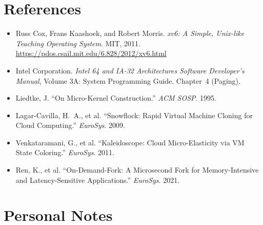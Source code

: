 \documentclass[11pt]{article}
\begin{document}
\section{References}

\begin{itemize}
    \item Russ Cox, Frans Kaashoek, and Robert Morris. \textit{xv6: A Simple, Unix-like Teaching Operating System}. MIT, 2011. \url{https://pdos.csail.mit.edu/6.828/2012/xv6.html}
    \item Intel Corporation. \textit{Intel 64 and IA-32 Architectures Software Developer's Manual}, Volume 3A: System Programming Guide. Chapter~4 (Paging).
    \item Liedtke, J. ``On Micro-Kernel Construction.'' \textit{ACM SOSP}. 1995.
    \item Lagar-Cavilla, H.~A., et al. ``Snowflock: Rapid Virtual Machine Cloning for Cloud Computing.'' \textit{EuroSys}. 2009.
    \item Venkataramani, G., et al. ``Kaleidoscope: Cloud Micro-Elasticity via VM State Coloring.'' \textit{EuroSys}. 2011.
    \item Ren, K., et al. ``On-Demand-Fork: A Microsecond Fork for Memory-Intensive and Latency-Sensitive Applications.'' \textit{EuroSys}. 2021.
\end{itemize}

\section*{Personal Notes}
\end{document}
